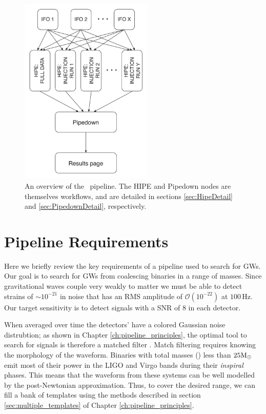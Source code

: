 \begin{figure}[h]
\center
\includegraphics[width=2.5in]{figures/ihopeOverview.pdf}
\caption{
An overview of the \ihope~pipeline. The HIPE and Pipedown nodes are themselves
workflows, and are detailed in sections \ref{sec:HipeDetail} and
\ref{sec:PipedownDetail}, respectively. 
}
\label{fig:ihopeOverview}
\end{figure}

\section{Pipeline Requirements}
\label{sec:PipelineRequirements}

Here we briefly review the key requirements of a pipeline used to search for
\ac{GW}s. Our goal is to search for \ac{GW}s from coalescing binaries in a
range of masses. Since gravitational waves couple very weakly to matter we must
be able to detect strains of $\sim10^{-21}$ in noise that has an RMS amplitude
of $\mathcal{O}(10^{-22})$ at $100\,$Hz. Our target sensitivity is to detect
signals with a \ac{SNR} of $8$ in each detector.

When averaged over time the detectors' have a colored Gaussian noise
distrubtion; as shown in Chapter \ref{ch:pipeline_principles}, the optimal tool
to search for signals is therefore a matched filter \cite{Brown}. Match
filtering requires knowing the morphology of the waveform. Binaries with total
masses (\mtotal) less than $25\mathrm{M_\odot}$ emit most of their power in the \ac{LIGO}
and Virgo bands during their {\it inspiral} phases.  This means that the
waveform from these systems can be well modelled by the post-Newtonian
approximation. Thus, to cover the desired range,
we can fill a bank of templates using the methods described in section
\ref{sec:multiple_templates} of Chapter \ref{ch:pipeline_principles}.

